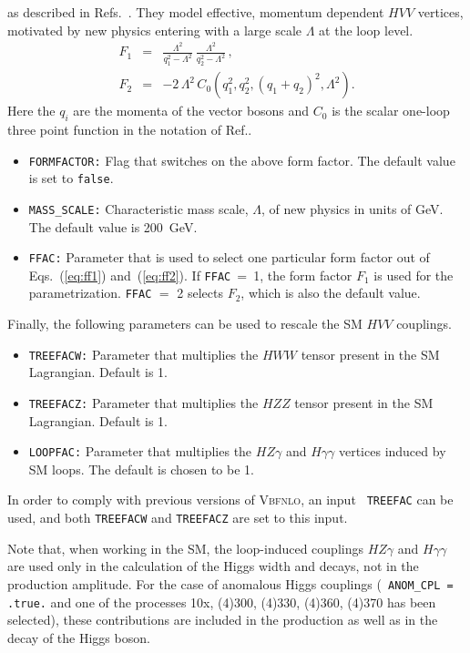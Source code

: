 \documentclass[english,12pt]{article}
\begin{document}
as described in Refs.~\cite{Figy:2004pt,Hankele:2006ma}. They model effective, 
momentum dependent $HVV$ vertices, motivated by new physics
entering with a large scale $\Lambda$ at the loop level.
\begin{eqnarray}
\label{eq:ff1}
F_1 &=& \frac{\Lambda^2}{q_1^2 - \Lambda^2}\ \frac{\Lambda^2}{q_2^2 -
  \Lambda^2}\,, 
\\
\label{eq:ff2}
F_2 &=& -2 \,\Lambda^2 \, C_0\!\left(q_1^2, q_2^2, (q_1+q_2)^2,
\Lambda^2\right). 
\end{eqnarray}
Here the $q_i$ are the momenta of the vector bosons and 
$C_{0}$ is the scalar one-loop three point function 
in the notation of Ref.\cite{Passarino:1978jh}.
\begin{itemize}
\item {\tt FORMFACTOR:} Flag that switches on the above 
 form factor. The default value is set to {\tt false}.
\item {\tt MASS\_SCALE:} Characteristic mass scale, $\Lambda$, of new physics 
 in units of GeV. The default value is 200~GeV.
\item {\tt FFAC:} Parameter that is used to select one particular form factor 
 out of Eqs.~(\ref{eq:ff1}) and~(\ref{eq:ff2}). If {\tt FFAC}~=~1,
  the form factor $F_{1}$ is used for the parametrization.
  {\tt FFAC} $=$ 2 selects $F_{2}$, which is also the default value.
\end{itemize}
Finally, the following parameters can be used to rescale the SM $HVV$ couplings.
\begin{itemize}
\item {\tt TREEFACW:} Parameter that multiplies the $HWW$
  tensor present in the SM Lagrangian. Default is 1.
\item {\tt TREEFACZ:} Parameter that multiplies the $HZZ$
  tensor present in the SM Lagrangian. Default is 1.  
\item {\tt LOOPFAC:} Parameter that multiplies the $HZ\gamma$ and $H\gamma\gamma$
  vertices induced by SM loops. The default is chosen to be 1.
\end{itemize}
In order to comply with previous versions of \textsc{Vbfnlo}, an input {\tt
TREEFAC} can be used, and both {\tt TREEFACW} and {\tt TREEFACZ} are set to this
input.

Note that, when working in the SM, the loop-induced couplings $HZ\gamma$ and
$H\gamma\gamma$ are used only in the calculation of the Higgs width and decays,
not in the production amplitude.  For the case of anomalous Higgs couplings ({\tt
ANOM\_CPL = .true.} and one of the processes 10x, (4)300, (4)330, (4)360, (4)370
has been selected), these contributions are included in the production as well
as in the decay of the Higgs boson.
\end{document}
